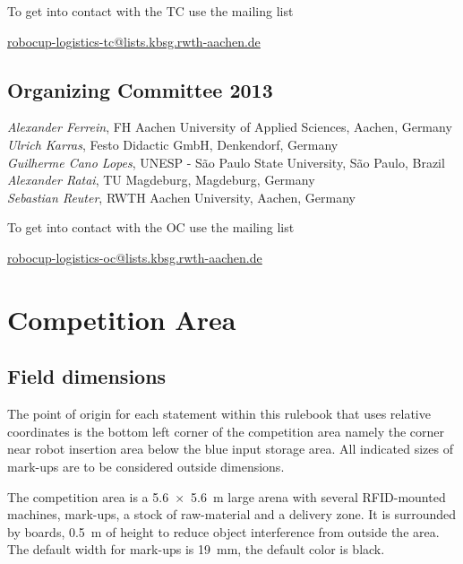 \documentclass[12pt,twoside]{article}
\begin{document}
\medskip

\noindent
To get into contact with the TC use the mailing list\\
\centerline{\url{robocup-logistics-tc@lists.kbsg.rwth-aachen.de}}

\subsection{Organizing Committee 2013} \label{sec:oc} 
\emph{Alexander Ferrein}, FH Aachen University of Applied Sciences,
Aachen, Germany\\
\emph{Ulrich Karras}, Festo Didactic GmbH, Denkendorf, Germany\\
\emph{Guilherme Cano Lopes}, UNESP - São Paulo State University, São Paulo,
Brazil\\
\emph{Alexander Ratai}, TU Magdeburg, Magdeburg, Germany\\
\emph{Sebastian Reuter}, RWTH Aachen University, Aachen, Germany

\medskip

\noindent
To get into contact with the OC use the mailing list\\
\centerline{\url{robocup-logistics-oc@lists.kbsg.rwth-aachen.de}}




\section{Competition Area} \label{sec:area}


\subsection{Field dimensions}
\label{sec:competition-area}
The point of origin for each statement within this rulebook that uses
relative coordinates is the bottom left corner of the competition area
namely the corner near robot insertion area below the blue input
storage area. All indicated sizes of mark-ups are to be considered
outside dimensions.

The competition area is a \SI{5.6 x 5.6}{\metre} large arena with
several RFID-mounted machines, mark-ups, a stock of raw-material and a
delivery zone. It is surrounded by boards, \SI{0.5}{\metre} of height
to reduce object interference from outside the area. The default width
for mark-ups is \SI{19}{\milli\metre}, the default color is black.
\end{document}
